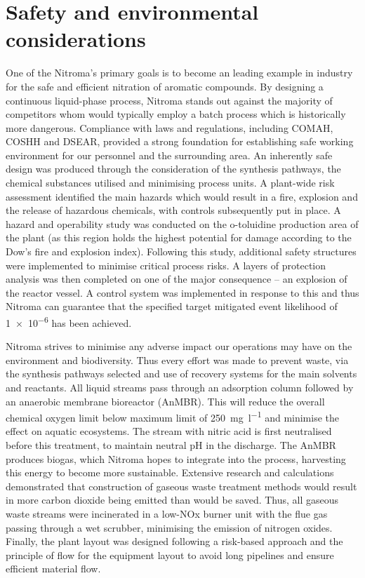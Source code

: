 \section*{Safety and environmental considerations}

 One of the Nitroma's primary goals is to become an leading example in industry for the safe and efficient nitration of aromatic compounds. By designing a continuous liquid-phase process, Nitroma stands out against the majority of competitors whom would typically employ a batch process which is historically more dangerous. Compliance with laws and regulations, including COMAH, COSHH and DSEAR, provided a strong foundation for establishing safe working environment for our personnel and the surrounding area. An inherently safe design was produced through the consideration of the synthesis pathways, the chemical substances utilised and minimising process units. A plant-wide risk assessment identified the main hazards which would result in a fire, explosion and the release of hazardous chemicals, with controls subsequently put in place. A hazard and operability study was conducted on the o-toluidine production area of the plant (as this region holds the highest potential for damage according to the Dow's fire and explosion index). Following this study, additional safety structures were implemented to minimise critical process risks. A layers of protection analysis was then completed on one of the major consequence – an explosion of the reactor vessel. A control system was implemented in response to this and thus Nitroma can guarantee that the specified target mitigated event likelihood of \num{1e-6} has been achieved.

Nitroma strives to minimise any adverse impact our operations may have on the environment and biodiversity. Thus every effort was made to prevent waste, via the synthesis pathways selected and use of recovery systems for the main solvents and reactants. All liquid streams pass through an adsorption column followed by an anaerobic membrane bioreactor (AnMBR). This will reduce the overall chemical oxygen limit below maximum limit of \SI{250}{\mg\per\litre} and minimise the effect on aquatic ecosystems. The stream with nitric acid is first neutralised before this treatment, to maintain neutral pH in the discharge. The AnMBR produces biogas, which Nitroma hopes to integrate into the process, harvesting this energy to become more sustainable.  Extensive research and calculations demonstrated that construction of gaseous waste treatment methods would result in more carbon dioxide being emitted than would be saved. Thus, all gaseous waste streams were incinerated in a low-NOx burner unit with the flue gas passing through a wet scrubber, minimising the emission of nitrogen oxides. Finally, the plant layout was designed following a risk-based approach and the principle of flow for the equipment layout to avoid long pipelines and ensure efficient material flow. 